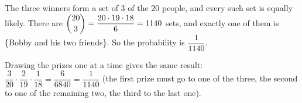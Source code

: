 The three winners form a set of $3$ of the $20$ people, and every such set is equally likely. There are $\dbinom{20}{3}=\dfrac{20\cdot19\cdot18}{6}=1140$ sets, and exactly one of them is \{Bobby and his two friends\}. So the probability is $\boxed{\dfrac{1}{1140}}$.

Drawing the prizes one at a time gives the same result: $\dfrac{3}{20}\cdot\dfrac{2}{19}\cdot\dfrac{1}{18}=\dfrac{6}{6840}=\dfrac{1}{1140}$ (the first prize must go to one of the three, the second to one of the remaining two, the third to the last one).
